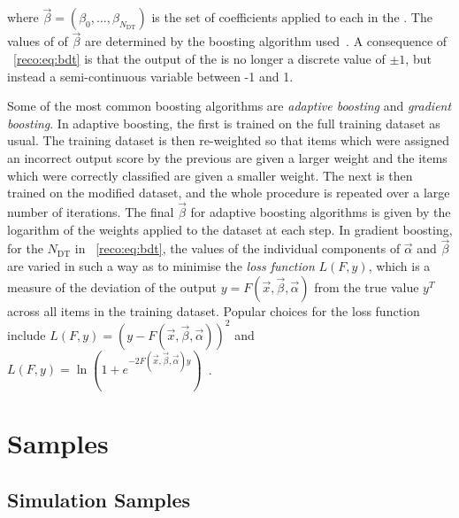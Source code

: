 where $\vec{\beta}=(\beta_{0},...,\beta_{N_{\textrm{DT}}})$ is the set of coefficients applied to each \DT in the \BDT. The values of of $\vec{\beta}$ are determined by the boosting algorithm used~\cite{friedman2009,TMVA}. A consequence of \Eq~\ref{reco:eq:bdt} is that the output of the \BDT is no longer a discrete value of $\pm1$, but instead a semi-continuous variable between -1 and 1. 

Some of the most common boosting algorithms are \emph{adaptive boosting} and \emph{gradient boosting}. In adaptive boosting, the first \DT is trained on the full training dataset as usual. The training dataset is then re-weighted so that items which were assigned an incorrect output score by the previous \DT are given a larger weight and the items which were correctly classified are given a smaller weight. The next \DT is then trained on the modified dataset, and the whole procedure is repeated over a large number of iterations. The final $\vec{\beta}$ for adaptive boosting algorithms is given by the logarithm of the weights applied to the dataset at each step. In gradient boosting, for the $N_{\textrm{DT}}$ \DT\s in \Eq~\ref{reco:eq:bdt}, the values of the individual components of $\vec{\alpha}$ and $\vec{\beta}$ are varied in such a way as to minimise the \emph{loss function} $L(F,y)$, which is a measure of the deviation of the \BDT output $y = F(\vec{x},\vec{\beta},\vec{\alpha})$ from the true value $y^T$ across all items in the training dataset. Popular choices for the loss function include $L(F,y) = ( y - F(\vec{x},\vec{\beta},\vec{\alpha}))^2$ and  $L(F,y) = \ln (1 + e^{-2F(\vec{x},\vec{\beta},\vec{\alpha})y})$~\cite{friedman2009,TMVA}.



\section{Samples}
\label{reco:sec:samples}
\subsection{Simulation Samples}

